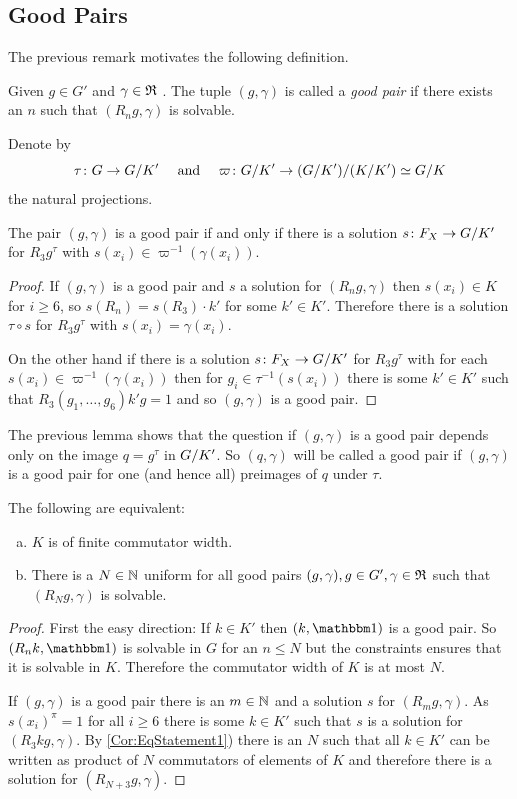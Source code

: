 \documentclass[a4paper,11pt]{amsart}
\begin{document}
\subsection{Good Pairs}\label{sec:good_pairs}
The previous remark motivates the following definition.
\begin{defi}
Given $g\in G'$ and $\gamma\in\mathfrak{R}$ . The tuple $(g,\gamma)$ is called a \emph{good pair} if there exists an $n$ such that
$(R_ng,\gamma)$ is solvable.  
\end{defi}

\begin{lem}
 Denote by 
 \[\tau\colon G\to{G/K'}\quad\text{ and }\quad\varpi\colon {G/K'} \to {({G/K'})/({K/K'})}\simeq {G/K}\]
 the natural projections.
 
 The pair $(g,\gamma)$ is a good pair if and only if there is a solution $s\colon F_X \to {G/K'}$ for $R_3g^\tau$ with $s(x_i) \in \varpi^{-1}(\gamma(x_i))$. 
\end{lem}
\begin{proof}
 If $(g,\gamma)$ is a good pair and $s$ a solution for $(R_ng,\gamma)$ 
 then $s(x_i)\in K$ for $i\geq6$, so $s(R_n) = s(R_3) \cdot k'$ for some $k'\in K'$. 
 Therefore there is a solution $\tau\circ s$ for $R_3g^\tau$ with $s(x_i) = \gamma(x_i)$.
 
 On the other hand if there is a solution $s\colon F_X \to {G/K'}$ for $R_3g^\tau$ with for each $s(x_i) \in \varpi^{-1}(\gamma(x_i))$ then
 for $g_i \in \tau^{-1}(s(x_i))$ there is some $k'\in K'$ such that $R_3(g_1,\ldots,g_6)k'g=1$ and so $(g,\gamma)$ is a good pair.
\end{proof}
The previous lemma shows that the question if $(g,\gamma)$ is a good pair depends only on the image $q=g^\tau$ in ${G/K'}$. So 
$(q,\gamma)$ will be called a good pair if $(g,\gamma)$ is a good pair for one (and hence all) preimages of $q$ under $\tau$.
\begin{cor}\label{cor:finiteCommutatorWidthKimpliesBoundedConstraintedCommutators}
The following are equivalent:
\begin{enumerate}[a)]
 \item $K$ is of finite commutator width. \label{Cor:EqStatement1}
 \item There is a $N\in\mathbb{N}$ uniform for all good pairs $(g,\gamma),g \in G',\gamma\in\mathfrak{R}$ such that $(R_Ng,\gamma)$ is solvable.
\end{enumerate}
\end{cor}
\begin{proof}
 First the easy direction: If $k\in K'$ then $(k,\id)$ is a good pair. So $(R_nk,\id)$ is solvable in $G$ for an $n\leq N$ but the constraints ensures that it is solvable in $K$.
 Therefore the commutator width of $K$ is at most $N$.
 
 If $(g,\gamma)$ is a good pair there is an $m\in \mathbb{N}$ and a solution $s$ for $(R_mg,\gamma)$. As $s(x_i)^\pi =1$ for all $i\geq 6$ there is some $k\in K'$ such that $s$ is 
 a solution for $(R_3kg,\gamma)$. By \ref{Cor:EqStatement1}) there is an $N$ such that all $k\in K'$ can be written as product of $N$ commutators of elements of $K$ and
 therefore there is a solution for $(R_{N+3}g,\gamma)$.
\end{proof}
\end{document}

